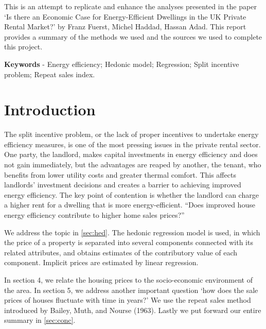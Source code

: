 \documentclass[12pt]{article}
\author{ABSTRACT}
\date{ }
\begin{document}
\setlength{\headheight}{14.49998pt}

\newpage

\maketitle

This is an attempt to replicate and enhance the analyses presented in the paper `Is there an Economic Case for Energy-Efficient Dwellings in the UK Private Rental Market?' by Franz Fuerst, Michel Haddad, Hassan Adad. This report provides a summary of the methods we used and the sources we used to complete this project.

\textbf{Keywords} - Energy efficiency; Hedonic model; Regression; Split incentive problem; Repeat sales index.
\newpage
\tableofcontents
\newpage
\section{Introduction}
The split incentive problem, or the lack of proper incentives to undertake energy efficiency measures, is one of the most pressing issues in the private rental sector. One party, the landlord, makes capital investments in energy efficiency and does not gain immediately, but the advantages are reaped by another, the tenant, who benefits from lower utility costs and greater thermal comfort. This affects landlords' investment decisions and creates a barrier to achieving improved energy efficiency. The key point of contention is whether the landlord can charge a higher rent for a dwelling that is more energy-efficient. ``Does improved house energy efficiency contribute to higher home sales prices?''

We address the topic in \autoref{sec:hed}. The hedonic regression model is used, in which the price of a property is separated into several components connected with its related attributes, and obtains estimates of the contributory value of each component. Implicit prices are estimated by linear regression.

In section 4, we relate the housing prices to the socio-economic environment of the area. In section 5, we address another important question `how does the sale prices of houses fluctuate with time in years?' We use the repeat sales method introduced by Bailey, Muth, and Nourse (1963). Lastly we put forward our entire summary in \autoref{sec:conc}.
\end{document}
